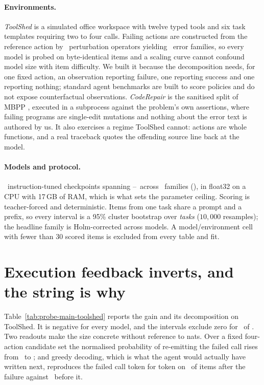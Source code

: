 \paragraph{Environments.}
\emph{ToolShed} is a simulated office workspace with twelve typed tools and six
task templates requiring two to four calls. Failing actions are constructed
from the reference action by \NumToolshedOperators\ perturbation operators
yielding \NumToolshedErrorTypes\ error families, so every model is probed on
byte-identical items and a scaling curve cannot confound model size with item
difficulty. We built it because the decomposition needs, for one fixed action,
an observation reporting failure, one reporting success and one reporting
nothing; standard agent benchmarks are built to score policies and do not
expose counterfactual observations. \emph{CodeRepair} is the sanitised split of
MBPP \citep{austin2021mbpp}, executed in a subprocess against the problem's own
assertions, where failing programs are single-edit mutations and nothing about
the error text is authored by us. It also exercises a regime ToolShed cannot:
actions are whole functions, and a real traceback quotes the offending source
line back at the model.

\paragraph{Models and protocol.}
\NumModels\ instruction-tuned checkpoints spanning
\SmallestModel--\LargestModel\ across \NumFamilies\ families
(\FamilyList), in float32 on a CPU with 17\,GB of RAM, which is what sets the
parameter ceiling. Scoring is teacher-forced and deterministic. Items from one
task share a prompt and a prefix, so every interval is a 95\% cluster bootstrap
over \emph{tasks} ($10{,}000$ resamples); the headline family is Holm-corrected
across models. A model/environment cell with fewer than 30 scored items is
excluded from every table and fit.

\section{Execution feedback inverts, and the string is why}
\label{sec:ws-results}



Table~\ref{tab:probe-main-toolshed} reports the gain and its decomposition on
ToolShed. It is negative for every model, and the intervals exclude zero for
\NumModelsNegativeG\ of \NumModelsToolshed. Two readouts make the size concrete
without reference to nats. Over a fixed four-action candidate set the
normalised probability of re-emitting the failed call rises from
\PRepeatPreMean\ to \PRepeatPostMean; and greedy decoding, which is what the
agent would actually have written next, reproduces the failed call token for
token on \GreedyPostMean\ of items after the failure against \GreedyPreMean\
before it.

